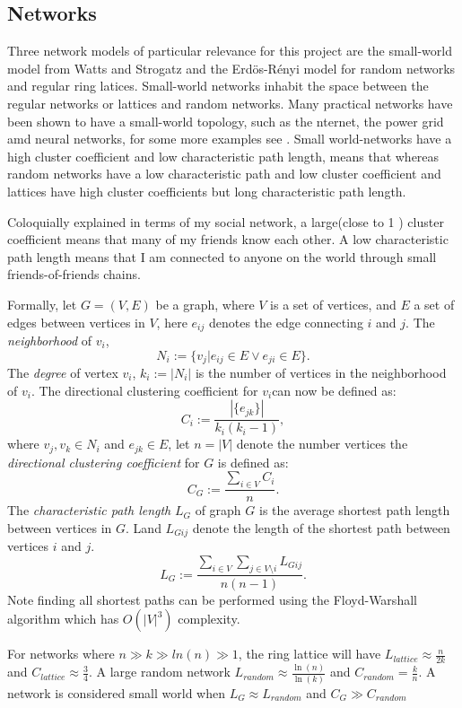 %
\subsection{Networks}

Three network models of particular relevance for this project are the small-world model \cite{watts1998collective} from Watts and Strogatz and the Erd\"{o}s-R\'{e}nyi model for random networks \cite{erdos1960evolution} and regular ring latices. Small-world networks inhabit the space between the regular networks or lattices and random networks. Many practical networks have been shown to have a small-world topology, such as the nternet, the power grid amd neural networks,  for some more examples see \cite{albert2002statistical}. Small world-networks have a high cluster coefficient and low characteristic path length, means that  whereas random networks have a low characteristic path and low cluster coefficient and lattices have high cluster coefficients but long characteristic path length.

Coloquially explained in terms of my social network, a large(close to 1 ) cluster coefficient means that many of my friends know each other. A low characteristic path length means that I am connected to anyone on the world through small friends-of-friends chains.

Formally, let $G=(V, E)$ be a graph, where $V$ is a set of vertices, and $E$ a set of edges between vertices in $V$, here $e_{ij}$ denotes the edge connecting $i$ and $j$.  The \textit{neighborhood} of $v_i$, $$N_i:=\{v_j|e_{ij}\in E \lor e_{ji}\in E\}.$$ The \textit{degree} of vertex $v_i$, $k_i:=|N_i|$ is the number of vertices in the neighborhood of $v_i$. The directional clustering coefficient for $v_i$can now be defined as:
$$C_i :=\frac{|\{e_{jk}\}|}{k_i(k_i-1)},$$
where $v_j,v_k\in N_i$ and $e_{jk}\in E$, let $n=|V|$ denote the number vertices the \textit{directional clustering coefficient} for $G$ is defined as:
$$C_G:=\frac{\sum_{i\in V} C_i}{n}.$$
The \textit{characteristic path length} $L_G$ of graph $G$ is the average shortest path length between vertices in $G$. Land  $L_{Gij}$ denote the length of the shortest path between vertices $i$ and $j$. 
$$L_G:= \frac{\sum_{i\in V} \sum_{j \in V\setminus i}L_{Gij}}{n(n-1)}.$$ 
Note finding all shortest paths can be performed using the Floyd-Warshall algorithm which has $O(|V|^3)$ complexity\cite{Floyd}.

For networks where $n\gg k\gg ln(n) \gg1$, the ring lattice will have $L_{lattice}\approx\frac{n}{2k}$ and $C_{lattice}\approx\frac{3}{4}$.
A large random network  $ L_{random}\approx\frac{\ln(n)}{\ln(k)}$ and $C_{random}=\frac{k}{n}$. A network is considered small world when $L_G\approx L_{random}$ and $C_G \gg C_{random}$

